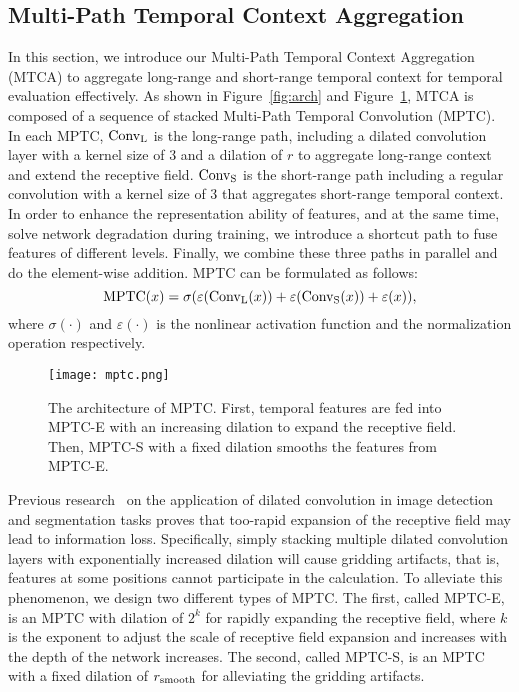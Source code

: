 \documentclass[letterpaper]{article} \usepackage{aaai22}  \usepackage{times}  \usepackage{helvet}  \usepackage{courier}  \usepackage[hyphens]{url}  \usepackage{graphicx} \urlstyle{rm} \def\UrlFont{\rm}  \usepackage{natbib}  \usepackage{caption} \DeclareCaptionStyle{ruled}{labelfont=normalfont,labelsep=colon,strut=off} \frenchspacing  \setlength{\pdfpagewidth}{8.5in}  \setlength{\pdfpageheight}{11in}  \usepackage{algorithm}
\begin{document}
\subsection{Multi-Path Temporal Context Aggregation} 






In this section, we introduce our Multi-Path Temporal Context Aggregation (MTCA) to aggregate long-range and short-range temporal context for temporal evaluation effectively.
As shown in Figure~\ref{fig:arch} and Figure~\ref{fig:mptc}, MTCA is composed of a sequence of stacked Multi-Path Temporal Convolution (MPTC).
In each MPTC, ${\rm Conv_L}$ is the long-range path, including a dilated convolution layer with a kernel size of 3 and a dilation of $r$ to aggregate long-range context and extend the receptive field. 
${\rm Conv_S}$ is the short-range path including a regular convolution with a kernel size of 3 that aggregates short-range temporal context.
In order to enhance the representation ability of features, and at the same time, solve network degradation during training, we introduce a shortcut path to fuse features of different levels.
Finally, we combine these three paths in parallel and do the element-wise addition.
MPTC can be formulated as follows:
\begin{equation}
\label{eqn:mptc}
{\rm MPTC}(x) = \sigma(\varepsilon({\rm Conv_L}(x))+\varepsilon({\rm Conv_S}(x))+ \varepsilon(x)),
\end{equation}
where $\sigma(\cdot)$ and $\varepsilon(\cdot)$ is the nonlinear activation function and the normalization operation respectively.


\begin{figure}[!t]
  \texttt{[image: mptc.png]}
  \caption{The architecture of MPTC. First, temporal features are fed into MPTC-E with an increasing dilation to expand the receptive field. Then, MPTC-S with a fixed dilation smooths the features from MPTC-E.}
  \label{fig:mptc}
\end{figure}




Previous research~\cite{hdc} on the application of dilated convolution in image detection and segmentation tasks proves that too-rapid expansion of the receptive field may lead to information loss.
Specifically, simply stacking multiple dilated convolution layers with exponentially increased dilation will cause gridding artifacts, that is, features at some positions cannot participate in the calculation.
To alleviate this phenomenon, we design two different types of MPTC. 
The first, called MPTC-E, is an MPTC with dilation of $2^k$ for rapidly expanding the receptive field, where $k$ is the exponent to adjust the scale of receptive field expansion and increases with the depth of the network increases. 
The second, called MPTC-S, is an MPTC with a fixed dilation of $r_{\rm smooth}$ for alleviating the gridding artifacts.
\end{document}
